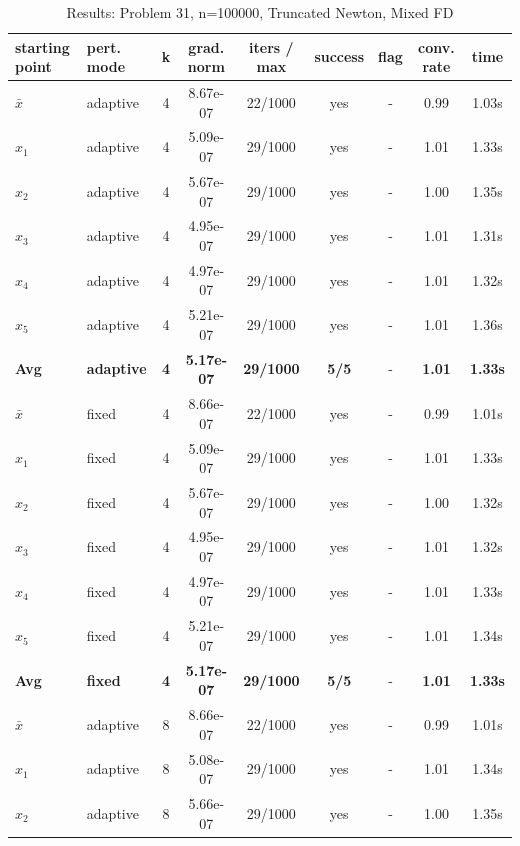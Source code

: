 \begin{longtable}{|l|l|c|c|c|c|c|c|c|}
\caption{Results: Problem 31, n=100000, Truncated Newton, Mixed FD} \\
\hline
\textbf{starting point} & \textbf{pert. mode} & \textbf{k} & \textbf{grad. norm} & \textbf{iters / max} & \textbf{success} & \textbf{flag} & \textbf{conv. rate} & \textbf{time} \\
\hline
\endfirsthead
\endhead
\endfoot
\hline
\endlastfoot
$\bar{x}$ & adaptive & 4 & 8.67e-07 & 22/1000 & yes & - & 0.99 & 1.03s \\
\hline
$x_1$ & adaptive & 4 & 5.09e-07 & 29/1000 & yes & - & 1.01 & 1.33s \\
\hline
$x_2$ & adaptive & 4 & 5.67e-07 & 29/1000 & yes & - & 1.00 & 1.35s \\
\hline
$x_3$ & adaptive & 4 & 4.95e-07 & 29/1000 & yes & - & 1.01 & 1.31s \\
\hline
$x_4$ & adaptive & 4 & 4.97e-07 & 29/1000 & yes & - & 1.01 & 1.32s \\
\hline
$x_5$ & adaptive & 4 & 5.21e-07 & 29/1000 & yes & - & 1.01 & 1.36s \\
\hline
\hline\hline
\textbf{Avg} & \textbf{adaptive} & \textbf{4} & \textbf{5.17e-07} & \textbf{29/1000} & \textbf{5/5} & - & \textbf{1.01} & \textbf{1.33s} \\
\hline\hline
\hline
$\bar{x}$ & fixed & 4 & 8.66e-07 & 22/1000 & yes & - & 0.99 & 1.01s \\
\hline
$x_1$ & fixed & 4 & 5.09e-07 & 29/1000 & yes & - & 1.01 & 1.33s \\
\hline
$x_2$ & fixed & 4 & 5.67e-07 & 29/1000 & yes & - & 1.00 & 1.32s \\
\hline
$x_3$ & fixed & 4 & 4.95e-07 & 29/1000 & yes & - & 1.01 & 1.32s \\
\hline
$x_4$ & fixed & 4 & 4.97e-07 & 29/1000 & yes & - & 1.01 & 1.33s \\
\hline
$x_5$ & fixed & 4 & 5.21e-07 & 29/1000 & yes & - & 1.01 & 1.34s \\
\hline
\hline\hline
\textbf{Avg} & \textbf{fixed} & \textbf{4} & \textbf{5.17e-07} & \textbf{29/1000} & \textbf{5/5} & - & \textbf{1.01} & \textbf{1.33s} \\
\hline\hline
$\bar{x}$ & adaptive & 8 & 8.66e-07 & 22/1000 & yes & - & 0.99 & 1.01s \\
\hline
$x_1$ & adaptive & 8 & 5.08e-07 & 29/1000 & yes & - & 1.01 & 1.34s \\
\hline
$x_2$ & adaptive & 8 & 5.66e-07 & 29/1000 & yes & - & 1.00 & 1.35s \\

\end{longtable}
